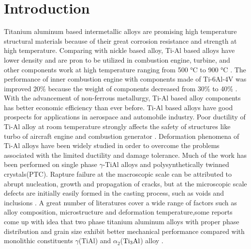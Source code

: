 \documentclass[Unknown,article,submit,moreauthors,pdftex,10pt,a4paper]{Definitions/mdpi}
\begin{document}
\section{Introduction}
Titanium  aluminum based intermetallic alloys are promising high temperature structural materials because of their great corrosion resistance and strength at high temperature. Comparing with nickle based alloy,  Ti-Al based alloys have lower density and are pron to be utilized in combustion engine, turbine, and other components work at high temperature ranging from 500 \si{\degreeCelsius} to 900 \si{\degreeCelsius} \cite{Clemens2016}. The performance of inner combustion engine with components made of Ti-6Al-4V was improved  20\% because the weight of components decreased from 30\% to 40\% \cite{Bewlay2016}. With the advancement of non-ferrous metallurgy, Ti-Al based alloy components has better economic efficiency than ever before. Ti-Al based alloys have good prospects for applications in aerospace and automobile industry. 
Poor ductility of Ti-Al alloy  at room temperature strongly affects the safety of structures like turbo of aircraft engine and combustion generator \cite{Munz2017}. Deformation phenomena of Ti-Al alloys have been widely studied in order to overcome the problems associated with the limited ductility and damage tolerance.  Much of the work has been performed on single phase $\gamma$-TiAl alloys and polysynthetically twinned crystals(PTC)\cite{Appel2016}. Rapture failure at the macroscopic scale can be attributed to abrupt nucleation, growth and propagation of cracks, but at the microscopic scale defects are initially easily formed in the casting process, such as voids and inclusions \cite{Tang2014}. A great number of literatures cover a wide range of factors such as alloy composition, microstructure and deformation temperature,some reports come up with idea that two phase titanium aluminum alloys with proper phase distribution and grain size exhibit better mechanical performance compared with monolithic constituents $\gamma$(TiAl) and $\alpha_2$($\rm Ti_3Al$) alloy \cite{Kim1995}. 
\end{document}
